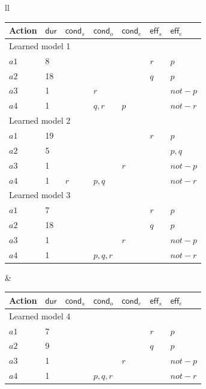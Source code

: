 \documentclass[runningheads]{llncs}
\newcommand{\eff}{\mathsf{eff}}    %
\newcommand{\cond}{\mathsf{cond}}  %
\newcommand{\dur}{\mathsf{dur}}    %
\begin{document}
\begin{figure}
\footnotesize
\begin{tabular}{ll}
\hspace{-0.6cm}\begin{tabular}{lllllll}
Action & $\dur$ & $\cond_s$ & $\cond_o$ & $\cond_e$ & $\eff_s$ & $\eff_e$ \\

\hline

\multicolumn{7}{l}{Learned model 1} \\
$a1$ & 8 & & & & $r$ & $p$ \\
$a2$ & 18 & & & & $q$ & $p$ \\
$a3$ & 1 & & $r$ & & & $not-p$ \\
$a4$ & 1 & & $q,r$ & $p$ & & $not-r$ \\

\hline

\multicolumn{7}{l}{Learned model 2} \\
$a1$ & 19 & & & & $r$ & $p$ \\
$a2$ & 5 & & & & & $p,q$ \\
$a3$ & 1 & & & $r$ & & $not-p$ \\
$a4$ & 1 & $r$ & $p,q$ & & & $not-r$ \\

\hline

\multicolumn{7}{l}{Learned model 3} \\
$a1$ & 7 & & & & $r$ & $p$ \\
$a2$ & 18 & & & & $q$ & $p$ \\
$a3$ & 1 & & & $r$  & & $not-p$ \\
$a4$ & 1 & & $p,q,r$ & & & $not-r$ \\
\end{tabular} &

\hspace{0.3cm}\begin{tabular}{lllllll}

Action & $\dur$ & $\cond_s$ & $\cond_o$ & $\cond_e$ & $\eff_s$ & $\eff_e$ \\

\hline

\multicolumn{7}{l}{Learned model 4} \\
$a1$ & 7 & & & & $r$ & $p$ \\
$a2$ & 9 & & & & $q$ & $p$ \\
$a3$ & 1 & & & $r$ & & $not-p$ \\
$a4$ & 1 & & $p,q,r$ & & & $not-r$ \\


\end{tabular}
\end{tabular}
\end{figure}
\end{document}
